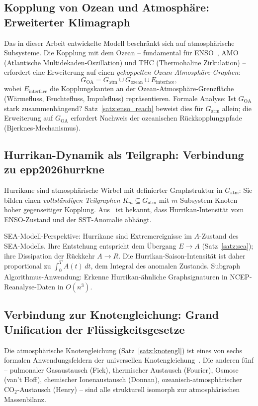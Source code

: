 ﻿\documentclass[a4paper,12pt]{article}
\theoremstyle{definition}
\begin{document}
\subsection{Kopplung von Ozean und Atmosph\"are: Erweiterter Klimagraph}

Das in dieser Arbeit entwickelte Modell beschr\"ankt sich auf atmosph\"arische
Subsysteme. Die Kopplung mit dem Ozean -- fundamental f\"ur ENSO~\cite{bjerknes1969},
AMO (Atlantische Multidekaden-Oszillation) und THC (Thermohaline Zirkulation) --
erfordert eine Erweiterung auf einen \emph{gekoppelten Ozean-Atmosph\"are-Graphen}:
\[
G_{\mathrm{OA}} = G_{\mathrm{atm}} \cup G_{\mathrm{ozean}} \cup E_{\mathrm{interface}},
\]
wobei $E_{\mathrm{interface}}$ die Kopplungskanten an der Ozean-Atmosph\"are-Grenzfl\"ache
(W\"armefluss, Feuchtefluss, Impulsfluss) repr\"asentieren.
Formale Analyse: Ist $G_{\mathrm{OA}}$ stark zusammenh\"angend?
Satz~\ref{satz:enso_reach} beweist dies f\"ur $G_{\mathrm{atm}}$ allein;
die Erweiterung auf $G_{\mathrm{OA}}$ erfordert Nachweis der
ozeanischen R\"uckkopplungspfade (Bjerknes-Mechanismus).

\subsection{Hurrikan-Dynamik als Teilgraph: Verbindung zu epp2026hurrkne}

Hurrikane sind atmosph\"arische Wirbel mit definierter Graphstruktur in $G_{\mathrm{atm}}$:
Sie bilden einen \emph{vollst\"andigen Teilgraphen} $K_m \subseteq G_{\mathrm{atm}}$
mit $m$ Subsystem-Knoten hoher gegenseitiger Kopplung. Aus~\cite{epp2026hurrkne} ist
bekannt, dass Hurrikan-Intensit\"at vom ENSO-Zustand und der SST-Anomalie abh\"angt.

SEA-Modell-Perspektive: Hurrikane sind Extremereignisse im $A$-Zustand des SEA-Modells.
Ihre Entstehung entspricht dem \"Ubergang $E \to A$ (Satz~\ref{satz:sea}); ihre
Dissipation der R\"uckkehr $A \to R$. Die Hurrikan-Saison-Intensit\"at ist daher
proportional zu $\int_0^T A(t)\,dt$, dem Integral des anomalen Zustands.
Subgraph Algorithmus-Anwendung: Erkenne Hurrikan-\"ahnliche Graphsignaturen
in NCEP-Reanalyse-Daten in $O(n^3)$.

\subsection{Verbindung zur Knotengleichung: Grand Unification der Fl\"ussigkeitsgesetze}

Die atmosph\"arische Knotengleichung (Satz~\ref{satz:knotengl}) ist eines von sechs
formalen Anwendungsfeldern der universellen Knotengleichung~\cite{epp2026knoten}.
Die anderen f\"unf -- pulmonaler Gasaustausch (Fick), thermischer Austausch (Fourier),
Osmose (van't Hoff), chemischer Ionenaustausch (Donnan), ozeanisch-atmosph\"arischer
CO$_2$-Austausch (Henry) -- sind alle strukturell isomorph zur atmosph\"arischen
Massenbilanz.
\end{document}
